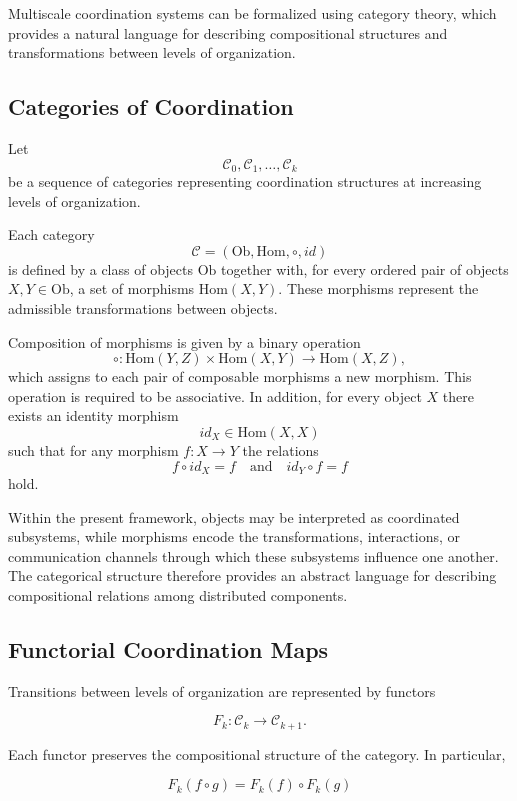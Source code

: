 \documentclass[12pt]{article}
\begin{document}
Multiscale coordination systems can be formalized using category theory, which provides a natural language for describing compositional structures and transformations between levels of organization.

\subsection{Categories of Coordination}

Let
\[
\mathcal{C}_0, \mathcal{C}_1, \dots , \mathcal{C}_k
\]
be a sequence of categories representing coordination structures at increasing levels of organization.

Each category
\[
\mathcal{C} = (\mathrm{Ob}, \mathrm{Hom}, \circ, id)
\]
is defined by a class of objects $\mathrm{Ob}$ together with, for every ordered pair of objects $X,Y \in \mathrm{Ob}$, a set of morphisms $\mathrm{Hom}(X,Y)$. These morphisms represent the admissible transformations between objects. 

Composition of morphisms is given by a binary operation
\[
\circ : \mathrm{Hom}(Y,Z) \times \mathrm{Hom}(X,Y) \rightarrow \mathrm{Hom}(X,Z),
\]
which assigns to each pair of composable morphisms a new morphism. This operation is required to be associative. In addition, for every object $X$ there exists an identity morphism
\[
id_X \in \mathrm{Hom}(X,X)
\]
such that for any morphism $f : X \rightarrow Y$ the relations
\[
f \circ id_X = f
\quad
\text{and}
\quad
id_Y \circ f = f
\]
hold.

Within the present framework, objects may be interpreted as coordinated subsystems, while morphisms encode the transformations, interactions, or communication channels through which these subsystems influence one another. The categorical structure therefore provides an abstract language for describing compositional relations among distributed components.

\subsection{Functorial Coordination Maps}

Transitions between levels of organization are represented by functors

\[
F_k : \mathcal{C}_k \rightarrow \mathcal{C}_{k+1}.
\]

Each functor preserves the compositional structure of the category. In particular,

\[
F_k(f \circ g) = F_k(f) \circ F_k(g)
\]
\end{document}
